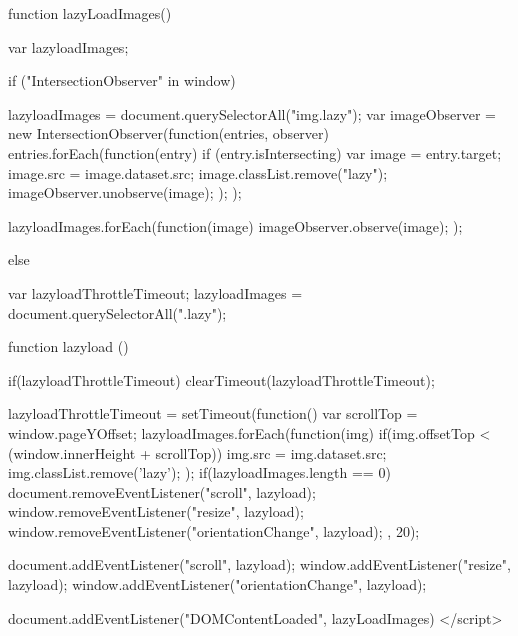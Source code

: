              function lazyLoadImages() {
                    var lazyloadImages;    

                    if ("IntersectionObserver" in window) {
                    lazyloadImages = document.querySelectorAll("img.lazy");
                    var imageObserver = new IntersectionObserver(function(entries, observer) {
                        entries.forEach(function(entry) {
                        if (entry.isIntersecting) {
                            var image = entry.target;
                            image.src = image.dataset.src;
                            image.classList.remove("lazy");
                            imageObserver.unobserve(image);
                        }
                        });
                    });

                    lazyloadImages.forEach(function(image) {
                        imageObserver.observe(image);
                    });
                    } else {  
                    var lazyloadThrottleTimeout;
                    lazyloadImages = document.querySelectorAll(".lazy");
    
                    function lazyload () {
                        if(lazyloadThrottleTimeout) {
                        clearTimeout(lazyloadThrottleTimeout);
                        }    

                        lazyloadThrottleTimeout = setTimeout(function() {
                        var scrollTop = window.pageYOffset;
                        lazyloadImages.forEach(function(img) {
                            if(img.offsetTop < (window.innerHeight + scrollTop)) {
                                img.src = img.dataset.src;
                                img.classList.remove('lazy');
                            }
                        });
                        if(lazyloadImages.length == 0) { 
                            document.removeEventListener("scroll", lazyload);
                            window.removeEventListener("resize", lazyload);
                            window.removeEventListener("orientationChange", lazyload);
                        }
                        }, 20);
                    }

                    document.addEventListener("scroll", lazyload);
                    window.addEventListener("resize", lazyload);
                    window.addEventListener("orientationChange", lazyload);
                    }
                }
                document.addEventListener("DOMContentLoaded", lazyLoadImages)
        </script>
